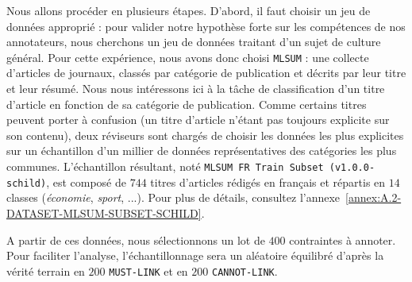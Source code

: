 			Nous allons procéder en plusieurs étapes.
			D'abord, il faut choisir un jeu de données approprié : pour valider notre hypothèse forte sur les compétences de nos annotateurs, nous cherchons un jeu de données traitant d'un sujet de culture général.
			Pour cette expérience, nous avons donc choisi \texttt{MLSUM} : une collecte d'articles de journaux, classés par catégorie de publication et décrits par leur titre et leur résumé.
			Nous nous intéressons ici à la tâche de classification d'un titre d'article en fonction de sa catégorie de publication.
			Comme certains titres peuvent porter à confusion (un titre d'article n'étant pas toujours explicite sur son contenu), deux réviseurs sont chargés de choisir les données les plus explicites sur un échantillon d'un millier de données représentatives des catégories les plus communes.
			L'échantillon résultant, noté \texttt{MLSUM FR Train Subset (v1.0.0-schild)}, est composé de $744$ titres d'articles rédigés en français et répartis en $14$ classes (\textit{économie}, \textit{sport}, ...).
			Pour plus de détails, consultez l'annexe~\ref{annex:A.2-DATASET-MLSUM-SUBSET-SCHILD}.
		
			A partir de ces données, nous sélectionnons un lot de $400$ contraintes à annoter.
			Pour faciliter l'analyse, l'échantillonnage sera un aléatoire équilibré d'après la vérité terrain en $200$ \texttt{MUST-LINK} et en $200$ \texttt{CANNOT-LINK}.
			
